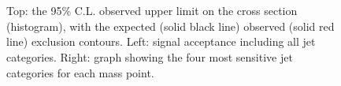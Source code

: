 \newpage
\begin{figure}[h!]
    \begin{center}
         \\
         ~~
         \\
        \caption{Top: the 95\% C.L. observed upper limit on the cross section
            (histogram), with the expected (solid black line) observed
            (solid red line) exclusion contours. Left: signal acceptance
            including all jet categories. Right: graph showing the four
            most sensitive jet categories for each mass point.
        }
        \label{fig:T1qqqqLL:ctau-1}
    \end{center}
\end{figure}

